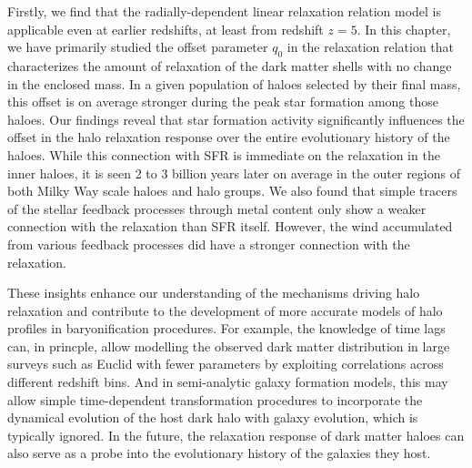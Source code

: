 Firstly, we find that the radially-dependent linear relaxation relation model is applicable even at earlier redshifts, at least from redshift $z=5$. In this chapter, we have primarily studied the offset parameter $q_0$ in the relaxation relation that characterizes the amount of relaxation of the dark matter shells with no change in the enclosed mass. In a given population of haloes selected by their final mass, this offset is on average stronger during the peak star formation among those haloes. 
Our findings reveal that star formation activity significantly influences the offset in the halo relaxation response  over the entire evolutionary history of the haloes. While this connection with SFR is immediate on the relaxation in the inner haloes, it is seen 2 to 3 billion years later on average in the outer regions of both Milky Way scale haloes and halo groups. %
%
We also found that simple tracers of the stellar feedback processes through metal content only show a weaker connection with the relaxation than SFR itself. However, the wind accumulated from various feedback processes did have a stronger connection with the relaxation.%

These insights enhance our understanding of the mechanisms driving halo relaxation and contribute to the development of more accurate models of halo profiles in baryonification procedures. 
For example, the knowledge of time lags can, in princple, allow modelling the observed dark matter distribution in large surveys such as Euclid with fewer parameters by exploiting correlations across different redshift bins.
And in semi-analytic galaxy formation models, this %
may allow simple time-dependent transformation procedures to incorporate the dynamical evolution of the host dark halo with galaxy evolution, which is typically ignored. In the future, the relaxation response of dark matter haloes can also serve as a probe into the evolutionary history of the galaxies they host.









